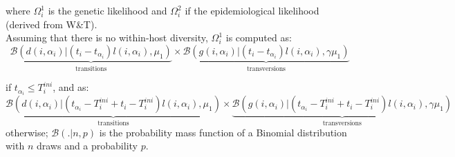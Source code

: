 \documentclass[10pt]{article}
\begin{document}
\noindent where $\Omega_i^1$ is the genetic likelihood and $\Omega_i^2$ if the epidemiological likelihood (derived from W\&T).
\\




Assuming that there is no within-host diversity, $\Omega_i^1$ is computed as: 
\begin{equation}
\underbrace{\mathcal{B}\left(d(i,\alpha_i) | (t_i - t_{\alpha_i}) l(i,\alpha_i), \mu_1 \right)}_{\mbox{transitions}}
\times 
\underbrace{\mathcal{B}\left(g(i,\alpha_i) | (t_i - t_{\alpha_i}) l(i,\alpha_i), \gamma \mu_1 \right)}_{\mbox{transversions}}
\end{equation}

if $t_{\alpha_i} \leq T_i^{ini} $, and as:
\begin{equation}
\underbrace{\mathcal{B}\left(d(i,\alpha_i) | (t_{\alpha_i} - T_i^{ini} + t_i - T_i^{ini}) l(i,\alpha_i), \mu_1 \right)}_{\mbox{transitions}}
\times 
\underbrace{\mathcal{B}\left(g(i,\alpha_i) | (t_{\alpha_i} - T_i^{ini} + t_i - T_i^{ini}) l(i,\alpha_i), \gamma \mu_1 \right)}_{\mbox{transversions}}
\end{equation}
otherwise; $\mathcal{B}(. | n, p)$ is the probability mass function of a Binomial distribution with $n$ draws and a probability $p$.
~\\

% 
~\\
\end{document}
